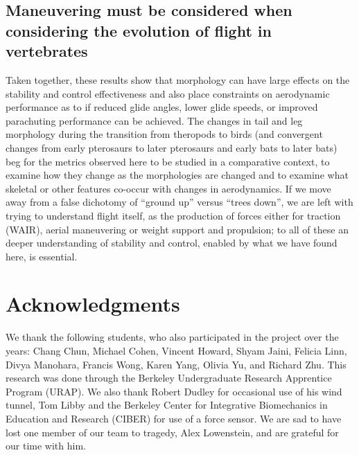 \subsection{Maneuvering must be considered when considering the evolution of flight in vertebrates}
Taken together, these results show that morphology can have large effects on the stability and control effectiveness and also place constraints on aerodynamic performance as to if reduced glide angles, lower glide speeds, or improved parachuting performance can be achieved. The changes in tail and leg morphology during the transition from theropods to birds (and convergent changes from early pterosaurs to later pterosaurs and early bats to later bats) beg for the metrics observed here to be studied in a comparative context, to examine how they change as the morphologies are changed and to examine what skeletal or other features co-occur with changes in aerodynamics.  If we move away from a false dichotomy of ``ground up'' versus ``trees down'', we are left with trying to understand flight itself, as the production of forces either for traction (WAIR), aerial maneuvering or weight support and propulsion; to all of these an deeper understanding of stability and control, enabled by what we have found here, is essential. 




















\section{Acknowledgments}
We thank the following students, who also participated in the \Mgui project over the years: Chang Chun, Michael Cohen, Vincent Howard, Shyam Jaini, Felicia Linn, Divya Manohara,  Francis Wong, Karen Yang, Olivia Yu, and Richard Zhu. This research was done through the Berkeley Undergraduate Research Apprentice Program (URAP). We also thank Robert Dudley for occasional use of his wind tunnel, Tom Libby and the Berkeley Center for Integrative Biomechanics in Education and Research (CIBER) for use of a force sensor.  We are sad to have lost one member of our team to tragedy, Alex Lowenstein, and are grateful for our time with 
him.  





